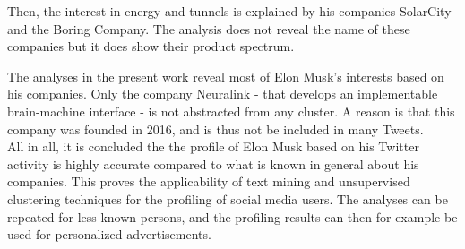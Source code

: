 Then, the interest in energy and tunnels is explained by his companies SolarCity and the Boring Company. The analysis does not reveal the name of these companies but it does show their product spectrum. 

The analyses in the present work reveal most of Elon Musk's interests based on his companies. Only the company Neuralink - that develops an implementable brain-machine interface - is not abstracted from any cluster. A reason is that this company was founded in 2016, and is thus not be included in many Tweets.\\

All in all, it is concluded the the profile of Elon Musk based on his Twitter activity is highly accurate compared to what is known in general about his companies. This proves the applicability of text mining and unsupervised clustering techniques for the profiling of social media users. The analyses can be repeated for less known persons, and the profiling results can then for example be used for personalized advertisements.